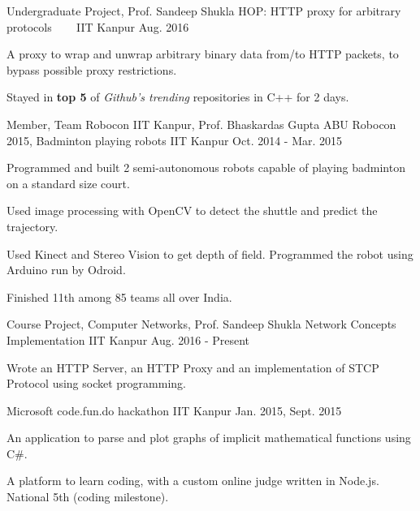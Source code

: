 \begin{cventries}
  \cventry
  {Undergraduate Project, Prof. Sandeep Shukla}
  {HOP: HTTP proxy for arbitrary protocols
    \ \ \ }
  {IIT Kanpur}
  {Aug. 2016}
  {
    \begin{cvitems}
    \item A proxy to wrap and unwrap arbitrary binary data from/to
      HTTP packets, to bypass possible proxy restrictions.
    \item Stayed in \textbf{top 5} of \textit{Github's trending}
      repositories in C++ for 2 days.
    \end{cvitems}
  }

  \cventry
  {Member, Team Robocon IIT Kanpur, Prof. Bhaskardas Gupta}
  {ABU Robocon 2015, Badminton playing robots}
  {IIT Kanpur}
  {Oct. 2014 - Mar. 2015}
  {
    \begin{cvitems}
    \item Programmed and built 2 semi-autonomous robots
      capable of playing badminton on a standard size court.
    \item Used image processing with OpenCV to detect the shuttle
      and predict the trajectory.
    \item Used Kinect and Stereo Vision to get depth of
      field. Programmed the robot using Arduino run by Odroid.
    \item Finished 11th among 85 teams all over India.
    \end{cvitems}
  }

  \cventry
  {Course Project, Computer Networks, Prof. Sandeep Shukla}
  {Network Concepts Implementation}
  {IIT Kanpur}
  {Aug. 2016 - Present}
  {
    \begin{cvitems}
    \item Wrote an HTTP Server, an HTTP Proxy and an implementation of
      STCP Protocol using socket programming.
    \end{cvitems}
  }


  {Microsoft code.fun.do hackathon}
  {IIT Kanpur}
  {Jan. 2015, Sept. 2015}
  {
    \begin{cvitems}
    \item An application to parse and plot graphs of implicit
      mathematical functions using C\#.
    \item A platform to learn coding, with a
      custom online judge written in Node.js. National 5th (coding milestone).
    \end{cvitems}
  }

\end{cventries}

